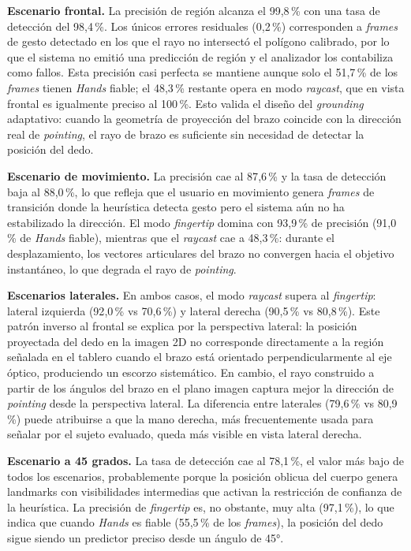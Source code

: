 \documentclass[12pt]{report} %
\begin{document}
\textbf{Escenario frontal.} La precisión de región alcanza el 99{,}8\,\% con una tasa de detección del 98{,}4\,\%. Los únicos errores residuales (0{,}2\,\%) corresponden a \textit{frames} de gesto detectado en los que el rayo no intersectó el polígono calibrado, por lo que el sistema no emitió una predicción de región y el analizador los contabiliza como fallos. Esta precisión casi perfecta se mantiene aunque solo el 51{,}7\,\% de los \textit{frames} tienen \textit{Hands} fiable; el 48{,}3\,\% restante opera en modo \textit{raycast}, que en vista frontal es igualmente preciso al 100\,\%. Esto valida el diseño del \textit{grounding} adaptativo: cuando la geometría de proyección del brazo coincide con la dirección real de \textit{pointing}, el rayo de brazo es suficiente sin necesidad de detectar la posición del dedo.

\textbf{Escenario de movimiento.} La precisión cae al 87{,}6\,\% y la tasa de detección baja al 88{,}0\,\%, lo que refleja que el usuario en movimiento genera \textit{frames} de transición donde la heurística detecta gesto pero el sistema aún no ha estabilizado la dirección. El modo \textit{fingertip} domina con 93{,}9\,\% de precisión (91{,}0\,\% de \textit{Hands} fiable), mientras que el \textit{raycast} cae a 48{,}3\,\%: durante el desplazamiento, los vectores articulares del brazo no convergen hacia el objetivo instantáneo, lo que degrada el rayo de \textit{pointing}.

\textbf{Escenarios laterales.} En ambos casos, el modo \textit{raycast} supera al \textit{fingertip}: lateral izquierda (92{,}0\,\% vs 70{,}6\,\%) y lateral derecha (90{,}5\,\% vs 80{,}8\,\%). Este patrón inverso al frontal se explica por la perspectiva lateral: la posición proyectada del dedo en la imagen 2D no corresponde directamente a la región señalada en el tablero cuando el brazo está orientado perpendicularmente al eje óptico, produciendo un escorzo sistemático. En cambio, el rayo construido a partir de los ángulos del brazo en el plano imagen captura mejor la dirección de \textit{pointing} desde la perspectiva lateral. La diferencia entre laterales (79{,}6\,\% vs 80{,}9\,\%) puede atribuirse a que la mano derecha, más frecuentemente usada para señalar por el sujeto evaluado, queda más visible en vista lateral derecha.

\textbf{Escenario a 45 grados.} La tasa de detección cae al 78{,}1\,\%, el valor más bajo de todos los escenarios, probablemente porque la posición oblicua del cuerpo genera landmarks con visibilidades intermedias que activan la restricción de confianza de la heurística. La precisión de \textit{fingertip} es, no obstante, muy alta (97{,}1\,\%), lo que indica que cuando \textit{Hands} es fiable (55{,}5\,\% de los \textit{frames}), la posición del dedo sigue siendo un predictor preciso desde un ángulo de 45°.
\end{document}
